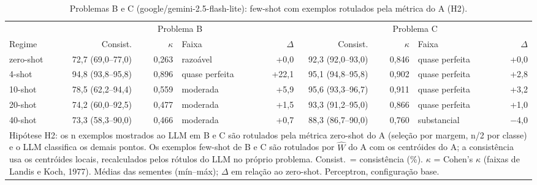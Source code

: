 \begin{table}[htbp]
\centering
\small
\caption{Problemas B e C (google/gemini-2.5-flash-lite): few-shot com exemplos rotulados pela métrica do A (H2).}
\label{tab:bloco1_BC_fewshot_exemplos_da_metrica_flashlite}
\begin{tabular}{lrrlrrrlr}
\toprule
 & \multicolumn{4}{c}{Problema B} & \multicolumn{4}{c}{Problema C} \\ \cmidrule(lr){2-5} \cmidrule(lr){6-9}
Regime & Consist. & $\kappa$ & Faixa & $\Delta$ & Consist. & $\kappa$ & Faixa & $\Delta$ \\
\midrule
zero-shot & 72,7 (69,0–77,0) & 0,263 & razoável & +0,0 & 92,3 (92,0–93,0) & 0,846 & quase perfeita & +0,0 \\
4-shot & 94,8 (93,8–95,8) & 0,896 & quase perfeita & +22,1 & 95,1 (94,8–95,8) & 0,902 & quase perfeita & +2,8 \\
10-shot & 78,5 (62,2–94,4) & 0,559 & moderada & +5,9 & 95,6 (93,3–96,7) & 0,911 & quase perfeita & +3,2 \\
20-shot & 74,2 (60,0–92,5) & 0,477 & moderada & +1,5 & 93,3 (91,2–95,0) & 0,866 & quase perfeita & +1,0 \\
40-shot & 73,3 (58,3–90,0) & 0,466 & moderada & +0,7 & 88,3 (86,7–90,0) & 0,760 & substancial & $-$4,0 \\
\bottomrule
\multicolumn{9}{p{0.95\linewidth}}{\footnotesize Hipótese H2: os n exemplos mostrados ao LLM em B e C são rotulados pela métrica zero-shot do A (seleção por margem, n/2 por classe) e o LLM classifica os demais pontos. Os exemplos few-shot de B e C são rotulados por $\hat{W}$ do A com os centróides do A; a consistência usa os centróides locais, recalculados pelos rótulos do LLM no próprio problema. Consist.\ = consistência (\%). $\kappa$ = Cohen's $\kappa$ (faixas de Landis e Koch, 1977). Médias das sementes (mín–máx); $\Delta$ em relação ao zero-shot. Perceptron, configuração base.} \\
\end{tabular}
\end{table}
